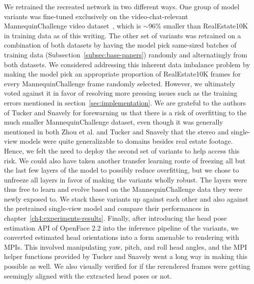 We retrained the recreated network in two different ways. One group of model variants was fine-tuned exclusively on the video-chat-relevant MannequinChallenge video dataset~\cite{li2019learning}, which is $\sim$96\% smaller than RealEstate10K in training data as of this writing. The other set of variants was retrained on a combination of both datasets by having the model pick same-sized batches of training data (Subsection~\ref{subsec:base-papers}) randomly and alternatingly from both datasets. We considered addressing this inherent data imbalance problem by making the model pick an appropriate proportion of RealEstate10K frames for every MannequinChallenge frame randomly selected. However, we ultimately voted against it in favor of resolving more pressing issues such as the training errors mentioned in section~\ref{sec:implementation}. We are grateful to the authors of Tucker and Snavely for forewarning us that there is a risk of overfitting to the much smaller MannequinChallenge dataset, even though it was generally mentioned in both Zhou et al. and Tucker and Snavely that the stereo and single-view models were quite generalizable to domains besides real estate footage. Hence, we felt the need to deploy the second set of variants to help access this risk. We could also have taken another transfer learning route of freezing all but the last few layers of the model to possibly reduce overfitting, but we chose to unfreeze all layers in favor of making the variants wholly robust. The layers were thus free to learn and evolve based on the MannequinChallenge data they were newly exposed to. We stack these variants up against each other and also against the pretrained single-view model and compare their performances in chapter~\ref{ch4:experiments-results}. Finally, after introducing the head pose estimation API of OpenFace 2.2 into the inference pipeline of the variants, we converted estimated head orientations into a form amenable to rendering with MPIs. This involved manipulating yaw, pitch, and roll head angles, and the MPI helper functions provided by Tucker and Snavely went a long way in making this possible as well. We also visually verified for if the rerendered frames were getting seemingly aligned with the extracted head poses or not.

% 
% 


